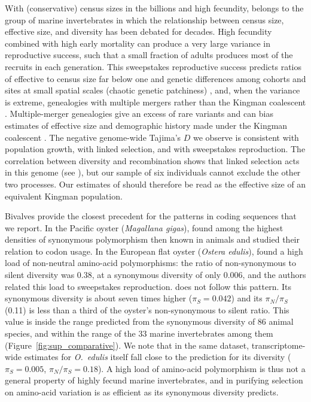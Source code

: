 With (conservative) census sizes in the billions
and high fecundity, \bgla{} belongs to the group of marine invertebrates in which the
relationship between census size, effective size, and diversity has been debated for decades.
High fecundity combined with high early mortality can produce a very large variance in
reproductive success, such that a small fraction of adults produces most of the recruits
in each generation.
This sweepstakes reproductive success predicts ratios of effective to census size far
below one and genetic differences among cohorts and sites at small spatial scales
(chaotic genetic patchiness) \citep{hedgecock_does_1994}, and, when the variance is
extreme, genealogies with multiple mergers rather than the Kingman coalescent
\citep{eldon_coalescent_2006}.
Multiple-merger genealogies give an excess of rare variants and can bias estimates of
effective size and demographic history made under the Kingman coalescent .
The negative genome-wide Tajima's $D$ we observe is consistent with population growth,
with linked selection, and with sweepstakes reproduction.
The correlation between diversity and recombination shows
that linked selection acts in this genome (see ), but our
sample of six individuals cannot exclude the other two processes.
Our estimates of \Ne{} should therefore be read as the effective size of an equivalent
Kingman population.
\vspace{0.1cm}

Bivalves provide the closest precedent for the patterns in coding
sequences that we report.
In the Pacific oyster (\textit{Magallana gigas}), \citet{sauvage_single_2007} found among
the highest densities of synonymous polymorphism then known in animals and studied their
relation to codon usage.
In the European flat oyster (\textit{Ostera edulis}), \citet{harrang_high_2013} found a
high load of non-neutral amino-acid polymorphisms: the ratio of non-synonymous to silent
diversity was 0.38, at a synonymous diversity of only 0.006, and the authors related this
load to sweepstakes reproduction.
\bgla{} does not follow this pattern.
Its synonymous diversity is about seven times higher ($\pi_S = 0.042$) and its
$\pi_N/\pi_S$ (0.11) is less than a third of the oyster's non-synonymous to silent ratio.
This value is inside the range predicted from the synonymous diversity of 86 animal
species, and within the range of the 33 marine invertebrates among them
\citep{romiguier_comparative_2014,galtier_adaptive_2016} (Figure~\ref{fig:sup_comparative}).
We note that in the same dataset, transcriptome-wide estimates for \textit{O.~edulis} itself
fall close to the prediction for its diversity ($\pi_S = 0.005$, $\pi_N/\pi_S = 0.18$).
A high load of amino-acid polymorphism is thus not a general property of highly fecund
marine invertebrates, and in \bgla{} purifying selection on amino-acid variation is as
efficient as its synonymous diversity predicts.
\vspace{0.1cm}

